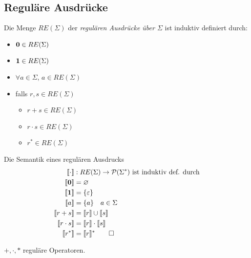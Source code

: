 \subsection{Reguläre Ausdrücke}
\begin{Def}[name={[RE($\Sigma$)]}]
        Die Menge $RE(\Sigma)$ der \emph{regulären Ausdrücke über $\Sigma$} ist induktiv definiert durch:
        \begin{itemize}
        \item $\mathbf{0}\in RE(\Sigma)$
        \item $\mathbf{1}\in RE(\Sigma)$
        \item $\forall a\in\Sigma$, $a\in RE(\Sigma)$
        \item falls $r,s\in RE(\Sigma)$
                \begin{itemize}[label=\textbullet]
                \item $r+s\in RE(\Sigma)$
                \item $r\cdot s\in RE(\Sigma)$
                \item $r^*\in RE(\Sigma)$
                \end{itemize}
        \end{itemize}
\end{Def}
\begin{Def}[name={[Semantik eines regulären Ausdrucks]}]
        Die Semantik eines regulären Ausdrucks
        \begin{align*}
                \llbracket\cdot \rrbracket &: RE(\Sigma) \-> \mathcal{P}(\Sigma^*)\text{ ist induktiv def. durch}\\
                \llbracket \0 \rrbracket &= \varnothing\\
                \llbracket \1 \rrbracket &= \{\Eps\}\\
                \llbracket a \rrbracket &= \{a\} \quad a\in\Sigma\\
                \llbracket r+s \rrbracket &= \llbracket r\rrbracket \cup \llbracket s\rrbracket\\
                \llbracket r\cdot s \rrbracket &= \llbracket r\rrbracket \cdot \llbracket s\rrbracket\\
                \llbracket r^* \rrbracket &= \llbracket r\rrbracket^* \qedhere
        \end{align*}
\end{Def}
$+,\cdot ,*$ reguläre Operatoren.\\
%
